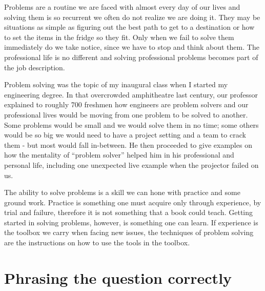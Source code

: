 

\noindent{}Problems are a routine we are faced with almost every day of our lives and
solving them is so recurrent we often do not realize we are doing it. They may
be situations as simple as figuring out the best path to get to a destination or
how to set the items in the fridge so they fit. Only when we fail to solve them
immediately do we take notice, since we have to stop and think about them. The
professional life is no different and solving professional problems becomes part
of the job description.

Problem solving was the topic of my inaugural class when I started my
engineering degree. In that overcrowded amphitheatre last century, our professor
explained to roughly 700 freshmen how engineers are problem solvers and our
professional lives would be moving from one problem to be solved to another.
Some problems would be small and we would solve them in no time; some others
would be so big we would need to have a project setting and a team to crack them 
- but most would fall in-between. He then proceeded to give examples on how the 
mentality of ``problem solver'' helped him in his professional and personal
life, including one unexpected live example when the projector failed on us.

The ability to solve problems is a skill we can hone with practice and some
ground work. Practice is something one must acquire only through experience, by
trial and failure, therefore it is not something that a book could teach.
Getting started in solving problems, however, is something one can learn. If
experience is the toolbox we carry when facing new issues, the techniques of
problem solving are the instructions on how to use the tools in the toolbox.

\section*{Phrasing the question correctly}


